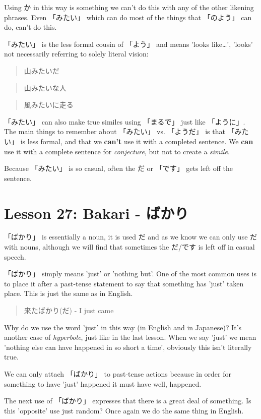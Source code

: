 \documentclass[11pt]{article}
\begin{document}
Using か in this way is something we can't do this with any of the other likening phrases. Even 「みたい」 which can do most of the things that 「のよう」 can do, can't do this.

「みたい」 is the less formal cousin of 「よう」 and means 'looks like\ldots{}', 'looks' not necessarily referring to solely literal vision:
\begin{quote}
山みたいだ
\end{quote}
\begin{quote}
山みたいな人
\end{quote}
\begin{quote}
風みたいに走る
\end{quote}
「みたい」 can also make true similes using 「まるで」 just like 「ように」. The main things to remember about 「みたい」 vs. 「ようだ」 is that 「みたい」 is less formal, and that we \textbf{can't} use it with a completed sentence. We \textbf{can} use it with a complete sentence for \emph{conjecture}, but not to create a \emph{simile}.

Because 「みたい」 is so casual, often the だ or 「です」 gets left off the sentence.
\section{Lesson 27: Bakari - ばかり}
\label{sec:orgd1ab912}
「ばかり」 is essentially a noun, it is used だ and as we know we can only use だ with nouns, although we will find that sometimes the だ/です is left off in casual speech.

「ばかり」 simply means 'just' or 'nothing but'. One of the most common uses is to place it after a past-tense statement to say that something has 'just' taken place. This is just the same as in English.
\begin{quote}
来たばかり(だ) - I just came
\end{quote}
Why do we use the word 'just' in this way (in English and in Japanese)? It's another case of \emph{hyperbole}, just like in the last lesson. When we say 'just' we mean 'nothing else can have happened in so short a time', obviously this isn't literally true.

We can only attach 「ばかり」 to past-tense actions because in order for something to have 'just' happened it must have well, happened.

The next use of 「ばかり」 expresses that there is a great deal of something. Is this 'opposite' use just random? Once again we do the same thing in English.
\end{document}
